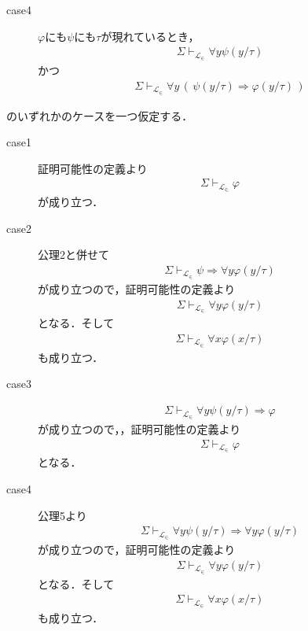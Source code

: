 \begin{sketch}
\begin{description}
			\item[case4] $\varphi$にも$\psi$にも$\tau$が現れているとき，
				\begin{align}
					\Sigma \vdash_{\mathcal{L}_{\in}} \forall y \psi(y/\tau)
				\end{align}
				かつ
				\begin{align}
					\Sigma \vdash_{\mathcal{L}_{\in}} \forall y\, (\, \psi(y/\tau) \Longrightarrow \varphi(y/\tau)\, )
				\end{align}
				
		\end{description}
		のいずれかのケースを一つ仮定する．
		\begin{description}
			\item[case1] 証明可能性の定義より
				\begin{align}
					\Sigma \vdash_{\mathcal{L}_{\in}} \varphi
				\end{align}
				が成り立つ．
				
			\item[case2]
				公理2と併せて
				\begin{align}
					\Sigma \vdash_{\mathcal{L}_{\in}} \psi \Longrightarrow \forall y \varphi(y/\tau)
				\end{align}
				が成り立つので，証明可能性の定義より
				\begin{align}
					\Sigma \vdash_{\mathcal{L}_{\in}} \forall y \varphi(y/\tau)
				\end{align}
				となる．そして
				\begin{align}
					\Sigma \vdash_{\mathcal{L}_{\in}} \forall x \varphi(x/\tau)
				\end{align}
				も成り立つ．
				
			\item[case3]
				\begin{align}
					\Sigma \vdash_{\mathcal{L}_{\in}} \forall y \psi(y/\tau) \Longrightarrow \varphi
				\end{align}
				が成り立つので，，証明可能性の定義より
				\begin{align}
					\Sigma \vdash_{\mathcal{L}_{\in}} \varphi
				\end{align}
				となる．
				
			\item[case4]
				公理5より
				\begin{align}
					\Sigma \vdash_{\mathcal{L}_{\in}} \forall y \psi(y/\tau) \Longrightarrow \forall y \varphi(y/\tau)
				\end{align}
				が成り立つので，証明可能性の定義より
				\begin{align}
					\Sigma \vdash_{\mathcal{L}_{\in}} \forall y \varphi(y/\tau)
				\end{align}
				となる．そして
				\begin{align}
					\Sigma \vdash_{\mathcal{L}_{\in}} \forall x \varphi(x/\tau)
				\end{align}
				も成り立つ．
				\QED
		\end{description}
	\end{sketch}
	
